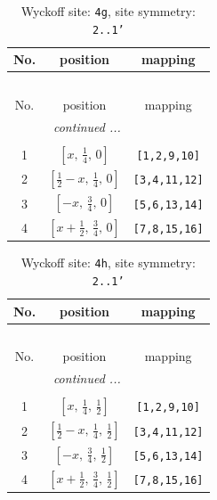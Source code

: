\documentclass[fleqn,8pt]{jsarticle}
\begin{document}
\renewcommand{\arraystretch}{1.2}
\begin{longtable}{ccc}
\caption{Wyckoff site: {\tt 4g}, site symmetry: {\tt 2..1'}}
 \\
 \hline \hline
No. & position & mapping \\ \hline \endfirsthead

\multicolumn{2}{l}{\tablename\ \thetable{}} \\
 \hline \hline
No. & position & mapping \\ \hline \endhead

 \hline \hline
\multicolumn{2}{r}{\footnotesize\it continued ...} \\ \endfoot

 \hline \hline
\multicolumn{2}{r}{} \\ \endlastfoot

1 & $\left[ x,\, \frac{1}{4},\, 0 \right]$ & {\tt [1,2,9,10]} \\ \hline
2 & $\left[ \frac{1}{2} - x,\, \frac{1}{4},\, 0 \right]$ & {\tt [3,4,11,12]} \\ \hline
3 & $\left[ - x,\, \frac{3}{4},\, 0 \right]$ & {\tt [5,6,13,14]} \\ \hline
4 & $\left[ x + \frac{1}{2},\, \frac{3}{4},\, 0 \right]$ & {\tt [7,8,15,16]} \\
\end{longtable}
\renewcommand{\arraystretch}{1.2}
\begin{longtable}{ccc}
\caption{Wyckoff site: {\tt 4h}, site symmetry: {\tt 2..1'}}
 \\
 \hline \hline
No. & position & mapping \\ \hline \endfirsthead

\multicolumn{2}{l}{\tablename\ \thetable{}} \\
 \hline \hline
No. & position & mapping \\ \hline \endhead

 \hline \hline
\multicolumn{2}{r}{\footnotesize\it continued ...} \\ \endfoot

 \hline \hline
\multicolumn{2}{r}{} \\ \endlastfoot

1 & $\left[ x,\, \frac{1}{4},\, \frac{1}{2} \right]$ & {\tt [1,2,9,10]} \\ \hline
2 & $\left[ \frac{1}{2} - x,\, \frac{1}{4},\, \frac{1}{2} \right]$ & {\tt [3,4,11,12]} \\ \hline
3 & $\left[ - x,\, \frac{3}{4},\, \frac{1}{2} \right]$ & {\tt [5,6,13,14]} \\ \hline
4 & $\left[ x + \frac{1}{2},\, \frac{3}{4},\, \frac{1}{2} \right]$ & {\tt [7,8,15,16]} \\
\end{longtable}
\end{document}
